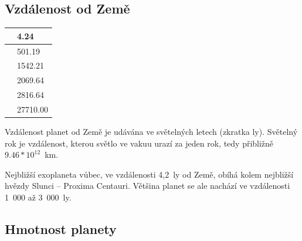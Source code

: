 \documentclass[a4paper,12pt]{article}
\begin{document}
\subsection{Vzdálenost od Země}

\setlength{\columnsep}{0\textwidth}
\begin{multicols}{2}
\begin{minipage}{0.3\textwidth}
\begin{tabular}{| l| l|}
   \hline
{\cellcolor[rgb]{0.85, 0.85, 0.85}{ Min }} & 4.24 \\ 
   \hline
{\cellcolor[rgb]{0.85, 0.85, 0.85}{ Qu1 }} & 501.19 \\ 
   \hline
{\cellcolor[rgb]{0.85, 0.85, 0.85}{ Median }} & 1542.21 \\ 
   \hline
{\cellcolor[rgb]{0.85, 0.85, 0.85}{ Mean }} & 2069.64 \\ 
   \hline
{\cellcolor[rgb]{0.85, 0.85, 0.85}{ Qu3 }} & 2816.64 \\ 
   \hline
{\cellcolor[rgb]{0.85, 0.85, 0.85}{ Max }} & 27710.00 \\ 
   \hline
\end{tabular}\end{minipage}
\begin{minipage}{0.7\textwidth}
Vzdálenost planet od Země je udávána ve světelných letech (zkratka ly). Světelný rok je vzdálenost, kterou světlo ve vakuu urazí za jeden rok, tedy přibližně $9.46 * 10^{12}$~km.

Nejbližší exoplaneta vůbec, ve vzdálenosti 4,2~ly od Země, obíhá kolem nejbližší hvězdy Slunci -- Proxima Centauri. Většina planet se ale nachází ve vzdálenosti 1~000 až 3~000~ly.
\end{minipage}
\end{multicols}

\subsection{Hmotnost planety}
\end{document}
